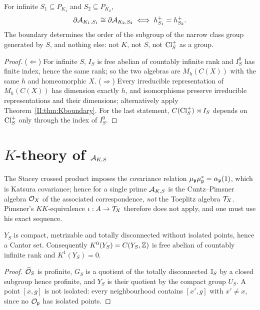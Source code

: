 \begin{theorem}\label{II:thm:rigid}
For infinite $S_1\subseteq P_{K_1}$ and $S_2\subseteq P_{K_2}$,
\[
\partial\mathcal{A}_{K_1,S_1}\cong\partial\mathcal{A}_{K_2,S_2}\iff h^+_{S_1}=h^+_{S_2} .
\]
The boundary determines the order of the subgroup of the narrow class group generated by
$S$, and nothing else: not $K$, not $S$, not $\operatorname{Cl}^+_S$ as a group.
\end{theorem}

\begin{proof}
($\Leftarrow$) For infinite $S$, $I_S$ is free abelian of countably infinite rank and
$I_S^0$ has finite index, hence the same rank; so the two algebras are
$M_h(C(X))$ with the same $h$ and homeomorphic $X$.
($\Rightarrow$) Every irreducible representation of $M_h(C(X))$ has dimension exactly $h$,
and isomorphisms preserve irreducible representations and their dimensions; alternatively
apply Theorem~\ref{II:thm:Kboundary}. For the last statement, $C(\operatorname{Cl}^+_S)\rtimes I_S$ depends
on $\operatorname{Cl}^+_S$ only through the index of $I_S^0$.
\end{proof}

\section{$K$-theory of $\mathcal{A}_{K,S}$}

The Stacey crossed product imposes the covariance relation $\mu_{\mathfrak{p}}\mu_{\mathfrak{p}}^*=\alpha_{\mathfrak{p}}(1)$,
which is Katsura covariance; hence for a single prime $\mathcal{A}_{K,S}$ is the Cuntz--Pimsner
algebra $\mathcal{O}_X$ of the associated correspondence, \emph{not} the Toeplitz algebra $\mathcal{T}_X$.
Pimsner's $KK$-equivalence $\iota:A\to\mathcal{T}_X$ therefore does not apply, and one must use his
exact sequence.

\begin{lemma}\label{II:lem:cantorspace}
$Y_S$ is compact, metrizable and totally disconnected without isolated points, hence a
Cantor set. Consequently $K^0(Y_S)=C(Y_S,\mathbb{Z})$ is free abelian of countably infinite rank and
$K^1(Y_S)=0$.
\end{lemma}

\begin{proof}
$\widehat{\mathcal{O}}_S$ is profinite, $G_S$ is a quotient of the totally disconnected $\mathbb{I}_S$ by a closed
subgroup hence profinite, and $Y_S$ is their quotient by the compact group $U_S$. A point
$[x,g]$ is not isolated: every neighbourhood contains $[x',g]$ with $x'\ne x$, since no
$\mathcal{O}_{\mathfrak{p}}$ has isolated points.
\end{proof}

